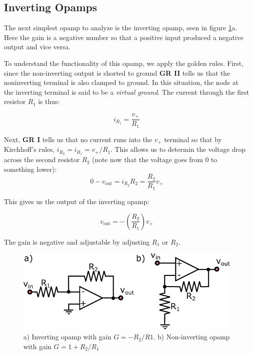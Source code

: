 \documentclass[]{article}
\begin{document}
\subsection{Inverting Opamps}
The next simplest opamp to analyze is the inverting opamp, seen in figure \ref{fig:inv_noninv_opamps}a. Here the gain is a negative number so that a positive input produced a negative output and vice versa. 

To understand the functionality of this opamp, we apply the golden rules. First, since the non-inverting output is shorted to ground \textbf{GR II} tells us that the noninverting terminal is also clamped to ground. In this situation, the node at the inverting terminal is said to be a \textit{virtual ground}. The current through the first resistor $R_1$ is thus:

\begin{equation}
\label{eq:inverting_opamp_deriv_1}
i_{R_1} = \frac{v_+}{R_1}
\end{equation}

Next, \textbf{GR I} tells us that no current runs into the $v_+$ terminal so that by Kirchhoff's rules, $i_{R_2} = i_{R_1} = v_+/R_1$. This allows us to determin the voltage drop across the second resistor $R_2$ (note now that the voltage goes from 0 to something lower):
\begin{equation}
\label{eq:inverting_opamp_deriv_2}
0-v_\text{out} = i_{R_2}R_2 = \frac{R_2}{R_1}v_+
\end{equation}

This gives us the output of the inverting opamp:

\begin{equation}
\label{eq:inverting_opamp}
v_\text{out} = -\left(\frac{R_2}{R_1}\right)v_+
\end{equation}

The gain is negative and adjustable by adjusting $R_1$ or $R_2$.

\begin{figure}[ht]
\caption{a) Inverting opamp with gain $G=-R_2/R1$. b) Non-inverting opamp with gain $G = 1+R_2/R_1$}
\label{fig:inv_noninv_opamps}
	\begin{center}
		\includegraphics[]{Images/inv_noninv_opamps.pdf}
	\end{center}
\end{figure}
\end{document}
